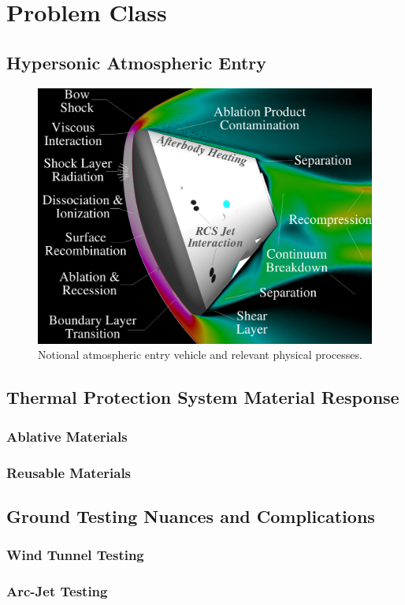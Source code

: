 \chapter{Problem Class}

\section{Hypersonic Atmospheric Entry}
\begin{figure}[hbtp]
  \begin{center}
    \includegraphics[width=\textwidth]{figures/misc/pretty}
  \end{center}
  \caption{Notional atmospheric entry vehicle and relevant physical processes.\label{fig:entry_overview}}
\end{figure}

\section{Thermal Protection System Material Response}
\subsection{Ablative Materials}
\subsection{Reusable Materials}

\section{Ground Testing Nuances and Complications} 
\subsection{Wind Tunnel Testing}
\subsection{Arc-Jet Testing}
